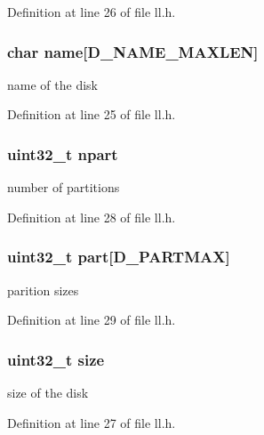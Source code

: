 Definition at line 26 of file ll.\+h.

\hypertarget{structd__stat_a6f90e58d4eed197561bceea400d4a08c}{}
\subsubsection[{name}]{\setlength{\rightskip}{0pt plus 5cm}char name\mbox{[}{\bf D\+\_\+\+N\+A\+M\+E\+\_\+\+M\+A\+X\+L\+E\+N}\mbox{]}}\label{structd__stat_a6f90e58d4eed197561bceea400d4a08c}
name of the disk 

Definition at line 25 of file ll.\+h.

\hypertarget{structd__stat_ac84778576a3eb0108d6839c8f24f373c}{}
\subsubsection[{npart}]{\setlength{\rightskip}{0pt plus 5cm}uint32\+\_\+t npart}\label{structd__stat_ac84778576a3eb0108d6839c8f24f373c}
number of partitions 

Definition at line 28 of file ll.\+h.

\hypertarget{structd__stat_a20c99bd7a6449e2daebe9beca4aa9a81}{}
\subsubsection[{part}]{\setlength{\rightskip}{0pt plus 5cm}uint32\+\_\+t part\mbox{[}{\bf D\+\_\+\+P\+A\+R\+T\+M\+A\+X}\mbox{]}}\label{structd__stat_a20c99bd7a6449e2daebe9beca4aa9a81}
parition sizes 

Definition at line 29 of file ll.\+h.

\hypertarget{structd__stat_ab2c6b258f02add8fdf4cfc7c371dd772}{}
\subsubsection[{size}]{\setlength{\rightskip}{0pt plus 5cm}uint32\+\_\+t size}\label{structd__stat_ab2c6b258f02add8fdf4cfc7c371dd772}
size of the disk 

Definition at line 27 of file ll.\+h.

\hypertarget{structd__stat_ab842bdb7d02be824fb48613032b4ff36}{}

